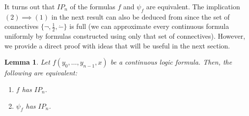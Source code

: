 \documentclass{amsart}
\newtheorem{lema}[teor]{Lemma}
\newtheorem{external claim}[teor]{Claim}
\begin{document}
It turns out that $IP_n$ of the formulas $f$ and $\psi_f$ are equivalent. The implication $(2)\implies (1)$ in the next result can also be deduced from \cite[Proposition 10.4 and Proposition 10.6]{Chernikov2020HypergraphRA} since the set of connectives $\{\neg, \frac{1}{2}, \dot{-}\}$ is full (we can approximate every continuous formula uniformly by formulas constructed using only that set of connectives). However, we provide a direct proof with ideas that will be useful in the next section.
\begin{lema} \label{IP_n f and psi}
    Let $f(y_0,\dots,y_{n-1},x)$ be a continuous logic formula. Then, the following are equivalent:
    \begin{enumerate}
        \item $f$ has $IP_n$.
        \item $\psi_f$ has $IP_n$.
    \end{enumerate}
\end{lema}
\end{document}

